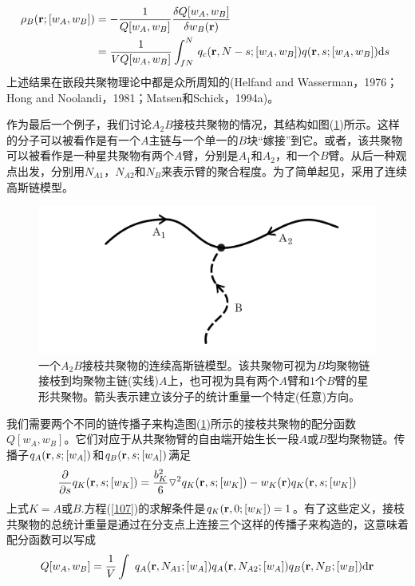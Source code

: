 \begin{equation}
\begin{aligned}
\rho _B(\mathbf{r};[w_A,w_B]) & =-\frac{1}{Q[w_A,w_B]}	\frac{\delta Q[w_A,w_B]}{\delta w_B(\mathbf{r})} \\
& =\frac{1}{VQ[w_A,w_B]} \int _{fN}^{N}\,q_c(\mathbf{r},N-s;[w_A,w_B])q(\mathbf{r},s;[w_A,w_B])\mathrm{d}s~ \\
\end{aligned}	
\end{equation}
上述结果在嵌段共聚物理论中都是众所周知的(Helfand and Wasserman，1976；Hong and Noolandi，1981；Matsen和Schick，1994a)。

作为最后一个例子，我们讨论$A_2B$接枝共聚物的情况，其结构如图(\ref{3.8})所示。这样的分子可以被看作是有一个$A$主链与一个单一的$B$块“嫁接”到它。或者，该共聚物可以被看作是一种星共聚物有两个$A$臂，分别是$A_1$和$A_2$，和一个$B$臂。从后一种观点出发，分别用$N_{A1}$，$N_{A2}$和$N_B$来表示臂的聚合程度。为了简单起见，采用了连续高斯链模型。

\begin{figure}[H]
\centering
\includegraphics[scale=0.7]{Contents/chapter3/figures/38.png}
\caption{一个$A_2B$接枝共聚物的连续高斯链模型。该共聚物可视为$B$均聚物链接枝到均聚物主链(实线)$A$上，也可视为具有两个$A$臂和$1$个$B$臂的星形共聚物。箭头表示建立该分子的统计重量一个特定(任意)方向。}
\label{3.8}
\end{figure}		

我们需要两个不同的链传播子来构造图(\ref{3.8})所示的接枝共聚物的配分函数$Q[w_A,w_B]$。它们对应于从共聚物臂的自由端开始生长一段$A$或$B$型均聚物链。传播子$q_A(\mathbf{r},s;[w_A])$和$q_B(\mathbf{r},s;[w_A])$满足
\begin{equation}
\frac{\partial}{\partial s}q_K(\mathbf{r},s;[w_K])=\frac{b_K^2}{6}\triangledown ^2q_K(\mathbf{r},s;[w_K])-w_K(\mathbf{r})q_K(\mathbf{r},s;[w_K]) \label{107}
\end{equation}
上式$K=A$或$B$.方程(\ref{107})的求解条件是$q_K(\mathbf{r},0;[w_K])=1$。有了这些定义，接枝共聚物的总统计重量是通过在分支点上连接三个这样的传播子来构造的，这意味着配分函数可以写成
\begin{equation}
Q[w_A,w_B]=\frac{1}{V}\int ~q_A(\mathbf{r},N_{A1};[w_A])q_A(\mathbf{r},N_{A2};[w_A])q_B(\mathbf{r},N_B;[w_B]) \mathrm{d}\mathbf{r}
\end{equation}

